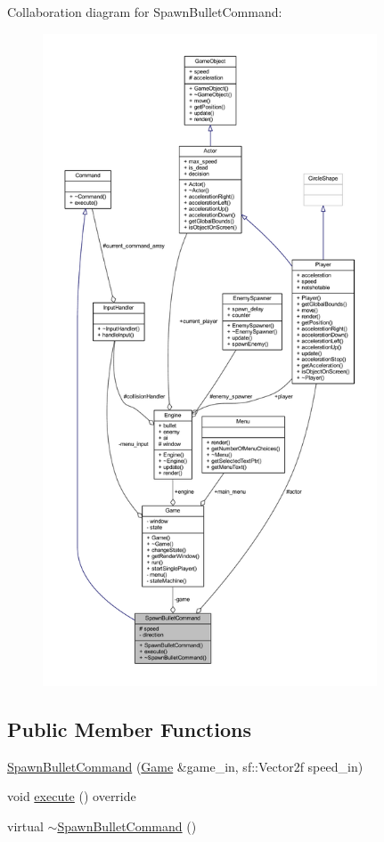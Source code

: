 Collaboration diagram for Spawn\+Bullet\+Command\+:
\nopagebreak
\begin{figure}[H]
\begin{center}
\leavevmode
\includegraphics[height=550pt]{class_spawn_bullet_command__coll__graph}
\end{center}
\end{figure}
\subsection*{Public Member Functions}
\begin{DoxyCompactItemize}
\item 
\hyperlink{class_spawn_bullet_command_a279b39ecc9491fe12812ac633ecbb992}{Spawn\+Bullet\+Command} (\hyperlink{class_game}{Game} \&game\+\_\+in, sf\+::\+Vector2f speed\+\_\+in)
\item 
void \hyperlink{class_spawn_bullet_command_a558af584b91637cd6bcf989d799eca4d}{execute} () override
\item 
virtual \hyperlink{class_spawn_bullet_command_ac22b1ce86d8ae1d7fb1df78745cb4db6}{$\sim$\+Spawn\+Bullet\+Command} ()
\end{DoxyCompactItemize}
